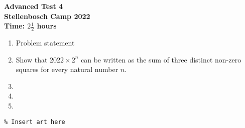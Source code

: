 \documentclass{article}
\begin{document}
\thispagestyle{empty}

\begin{center}
  \textbf{\Large Advanced Test 4}
  \\ \vspace{1em}
  \textbf{\large Stellenbosch Camp 2022}
  \\ \vspace{1em}
  \textbf{\large Time: $2\frac{1}{2}$ hours}
\end{center}

\bigskip

\begin{enumerate}[itemsep=\fill]

\item %
Problem statement


\item %
Show that $2022 \times 2^n$ can be written as the sum of three distinct non-zero squares for every natural number $n$.


\item %


\item %


\item %

\end{enumerate}


\centering
\small
\begin{BVerbatim}
\end{BVerbatim}
\end{document}
